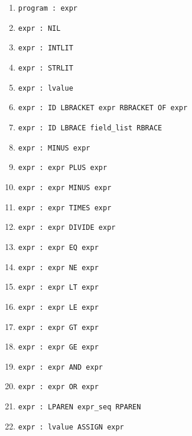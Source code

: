 \documentclass{article}
\begin{document}
\begin{enumerate}

\item \verb|program : expr|

\item \verb|expr : NIL|

\item \verb|expr : INTLIT|

\item \verb|expr : STRLIT|

\item \verb|expr : lvalue|

\item \verb|expr : ID LBRACKET expr RBRACKET OF expr|

\item \verb|expr : ID LBRACE field_list RBRACE|

\item \verb|expr : MINUS expr|

\item \verb|expr : expr PLUS expr|

\item \verb|expr : expr MINUS expr|

\item \verb|expr : expr TIMES expr|

\item \verb|expr : expr DIVIDE expr|

\item \verb|expr : expr EQ expr|

\item \verb|expr : expr NE expr|

\item \verb|expr : expr LT expr|

\item \verb|expr : expr LE expr|

\item \verb|expr : expr GT expr|

\item \verb|expr : expr GE expr|

\item \verb|expr : expr AND expr|

\item \verb|expr : expr OR expr|

\item \verb|expr : LPAREN expr_seq RPAREN|

\item \verb|expr : lvalue ASSIGN expr|


\end{enumerate}
\end{document}
